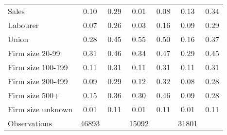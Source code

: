 {\begin{tabular}{l*{3}{cc}}
Sales               &        0.10&        0.29&        0.01&        0.08&        0.13&        0.34\\
Labourer            &        0.07&        0.26&        0.03&        0.16&        0.09&        0.29\\
Union               &        0.28&        0.45&        0.55&        0.50&        0.16&        0.37\\
Firm size 20-99     &        0.31&        0.46&        0.34&        0.47&        0.29&        0.45\\
Firm size 100-199   &        0.11&        0.31&        0.11&        0.31&        0.11&        0.31\\
Firm size 200-499   &        0.09&        0.29&        0.12&        0.32&        0.08&        0.28\\
Firm size 500+      &        0.15&        0.36&        0.30&        0.46&        0.09&        0.28\\
Firm size unknown   &        0.01&        0.11&        0.01&        0.11&        0.01&        0.11\\
\hline
Observations        &       46893&            &       15092&            &       31801&            \\
\hline\hline
\end{tabular}
}
